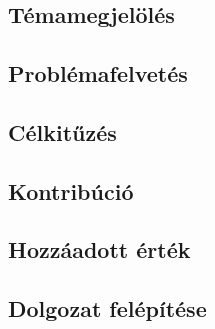 \chapter{\bevezetes}

\section{Témamegjelölés}
\section{Problémafelvetés}
\section{Célkitűzés}	
\section{Kontribúció}
\section{Hozzáadott érték}	
\section{Dolgozat felépítése}